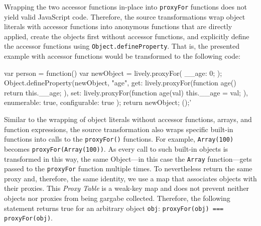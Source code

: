 Wrapping the two accessor functions in-place into \lstinline{proxyFor} functions does not yield valid JavaScript code.
Therefore, the source transformations wrap object literals with accessor functions into anonymous functions that are directly applied, create the objects first without accessor functions, and explicitly define the accessor functions using \lstinline{Object.defineProperty}.
That is, the presented example with accessor functions would be transformed to the following code: \\

\iffalse
\begin{verbatim}\fi
\begin{code}{}{}
var person = function() {
    var newObject = lively.proxyFor({
        __age: 0;
    });
    Object.defineProperty(newObject, "age", {
        get: lively.proxyFor(function age() {
            return this.__age;
        }),
        set: lively.proxyFor(function age(val) {
            this.__age = val;
        }),
        enumerable: true,
        configurable: true
    });
    return newObject;
}();'
\end{code}
\iffalse
\end{verbatim}\fi

Similar to the wrapping of object literals without accessor functions, arrays, and function expressions, the source transformation also wraps specific built-in functions into calls to the \lstinline{proxyFor()} functions.
For example, \lstinline{Array(100)} becomes \lstinline{proxyFor(Array(100))}.
As every call to such built-in objects is transformed in this way, the same Object---in this case the \lstinline{Array} function---gets passed to the \lstinline{proxyFor} function multiple times.
To nevertheless return the same proxy and, therefore, the same identity, we use a map that associates objects with their proxies.
This \emph{Proxy Table} is a weak-key map and does not prevent neither objects nor proxies from being gargabe collected.
Therefore, the following statement returns true for an arbitrary object \lstinline{obj}: \lstinline{proxyFor(obj) === proxyFor(obj)}.

